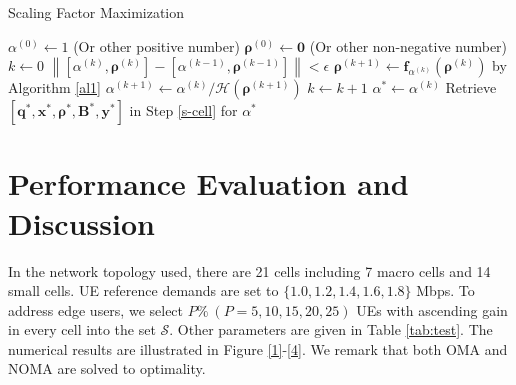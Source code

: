 \documentclass[10pt,journal,final,finalsubmission,twocolumn]{IEEEtran}
\begin{document}
\begin{algorithm}[tbp]\label{al2}
\caption{Scaling Factor Maximization} 
$\alpha^{(0)}\leftarrow 1$ (Or other positive number)\;
$\boldsymbol{\rho}^{(0)}\leftarrow \boldsymbol{0}$ (Or other non-negative number)\;
$k\leftarrow0$\;
\Repeat 
{
$\left \|[\alpha^{(k)}, \boldsymbol{\rho}^{(k)}]-[\alpha^{(k-1)},\boldsymbol{\rho}^{(k-1)}] \right \|<\epsilon$
}
{
$ \boldsymbol{\rho}^{\left(k+1\right)} \leftarrow\boldsymbol{f}_{\alpha^{(k)}}\left(\boldsymbol{\rho}^{(k)}\right)$ by Algorithm \ref{al1}\label{s-cell}\;
$\alpha ^{\left(k+1\right)} \leftarrow \alpha ^{(k)} / \mathcal{H}\left(\boldsymbol{\rho}^{(k+1)}\right)$\;
$k\leftarrow k+1$\;
}  
$\alpha^*\leftarrow \alpha^{(k)}$\;
Retrieve $[\boldsymbol{q}^*,\boldsymbol{x}^*,\boldsymbol{\rho}^*, \boldsymbol{B}^*,\boldsymbol{y}^*]$ in Step \ref{s-cell} for $\alpha^*$\;
\;
\end{algorithm} 



\section{Performance Evaluation and Discussion}\label{Sec:PerformanceEvaluationDiscussions}

In the network topology used, there are 21 cells including 7 macro cells and 14 small cells. UE reference demands are set to $\{1.0, 1.2, 1.4, 1.6, 1.8\}$ Mbps. To address edge users, we select $P\%\ (P=5, 10, 15, 20, 25)$ UEs with ascending gain in every cell into the set $\mathcal{S}$. Other parameters are given in Table \ref{tab:test}. The numerical results are illustrated in Figure \ref{1}-\ref{4}. We remark that both OMA and NOMA are solved to optimality.
\end{document}
